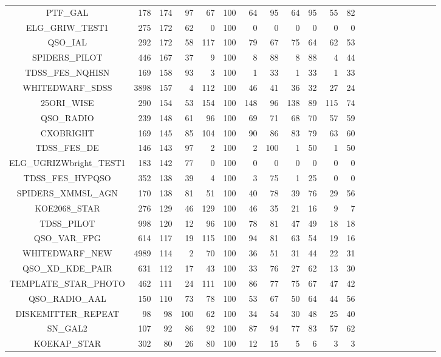 \documentclass[onecolumn]{aa}
\begin{document}
\begin{center}
\begin{longtable}{c rrr rrr rrrrrrrrrrrrrr}
PTF\_GAL & 178 & 174 & 97 & 67 & 100 & 64 & 95 & 64 & 95 & 55 & 82 \\ 
ELG\_GRIW\_TEST1 & 275 & 172 & 62 & 0 & 100 & 0 & 0 & 0 & 0 & 0 & 0 \\ 
QSO\_IAL & 292 & 172 & 58 & 117 & 100 & 79 & 67 & 75 & 64 & 62 & 53 \\ 
SPIDERS\_PILOT & 446 & 167 & 37 & 9 & 100 & 8 & 88 & 8 & 88 & 4 & 44 \\ 
TDSS\_FES\_NQHISN & 169 & 158 & 93 & 3 & 100 & 1 & 33 & 1 & 33 & 1 & 33 \\ 
WHITEDWARF\_SDSS & 3898 & 157 & 4 & 112 & 100 & 46 & 41 & 36 & 32 & 27 & 24 \\ 
25ORI\_WISE & 290 & 154 & 53 & 154 & 100 & 148 & 96 & 138 & 89 & 115 & 74 \\ 
QSO\_RADIO & 239 & 148 & 61 & 96 & 100 & 69 & 71 & 68 & 70 & 57 & 59 \\ 
CXOBRIGHT & 169 & 145 & 85 & 104 & 100 & 90 & 86 & 83 & 79 & 63 & 60 \\ 
TDSS\_FES\_DE & 146 & 143 & 97 & 2 & 100 & 2 & 100 & 1 & 50 & 1 & 50 \\ 
ELG\_UGRIZWbright\_TEST1 & 183 & 142 & 77 & 0 & 100 & 0 & 0 & 0 & 0 & 0 & 0 \\ 
TDSS\_FES\_HYPQSO & 352 & 138 & 39 & 4 & 100 & 3 & 75 & 1 & 25 & 0 & 0 \\ 
SPIDERS\_XMMSL\_AGN & 170 & 138 & 81 & 51 & 100 & 40 & 78 & 39 & 76 & 29 & 56 \\ 
KOE2068\_STAR & 276 & 129 & 46 & 129 & 100 & 46 & 35 & 21 & 16 & 9 & 7 \\ 
TDSS\_PILOT & 998 & 120 & 12 & 96 & 100 & 78 & 81 & 47 & 49 & 18 & 18 \\ 
QSO\_VAR\_FPG & 614 & 117 & 19 & 115 & 100 & 94 & 81 & 63 & 54 & 19 & 16 \\ 
WHITEDWARF\_NEW & 4989 & 114 & 2 & 70 & 100 & 36 & 51 & 31 & 44 & 22 & 31 \\ 
QSO\_XD\_KDE\_PAIR & 631 & 112 & 17 & 43 & 100 & 33 & 76 & 27 & 62 & 13 & 30 \\ 
TEMPLATE\_STAR\_PHOTO & 462 & 111 & 24 & 111 & 100 & 86 & 77 & 75 & 67 & 47 & 42 \\ 
QSO\_RADIO\_AAL & 150 & 110 & 73 & 78 & 100 & 53 & 67 & 50 & 64 & 44 & 56 \\ 
DISKEMITTER\_REPEAT & 98 & 98 & 100 & 62 & 100 & 34 & 54 & 30 & 48 & 25 & 40 \\ 
SN\_GAL2 & 107 & 92 & 86 & 92 & 100 & 87 & 94 & 77 & 83 & 57 & 62 \\ 
KOEKAP\_STAR & 302 & 80 & 26 & 80 & 100 & 12 & 15 & 5 & 6 & 3 & 3 \\ 

\end{longtable}
\end{center}
\end{document}
